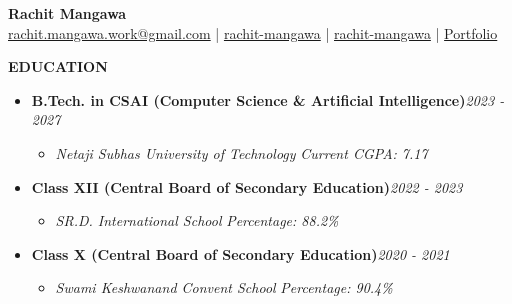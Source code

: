 \documentclass[10pt]{article}
\newcommand{\resheading}[1]{{\small \colorbox{mygrey}{\begin{minipage}{\dimexpr\textwidth-2\fboxsep\relax}\textbf{#1 \vphantom{p\^{E}}}\end{minipage}}}}
\begin{document}
\noindent
\begin{minipage}{1.0\linewidth}
    \centering
    {\huge\bfseries Rachit Mangawa}\\[3pt]
    {
  \href{mailto:rachit.mangawa.work@gmail.com}{rachit.mangawa.work@gmail.com} |
     \href{https://www.linkedin.com/in/rachit-mangawa/}{rachit-mangawa} |
     \href{https://github.com/rachit-mangawa}{rachit-mangawa} | 
    \href{https://rachit-mangawa.github.io/}{Portfolio}}
\end{minipage}

\vspace{4pt}

\noindent
\resheading{EDUCATION}
\begin{itemize}[leftmargin=*]\small
\item \textbf{B.Tech. in CSAI (Computer Science \& Artificial Intelligence)}\hfill \textit{2023 - 2027}
\begin{itemize}[noitemsep, leftmargin=*, label=-]\footnotesize
\item \textit{Netaji Subhas University of Technology} \hfill \textit{Current CGPA: 7.17}
\end{itemize}
\end{itemize}

\begin{itemize}[leftmargin=*]\small
\item \textbf{Class XII (Central Board of Secondary Education)}\hfill \textit{2022 - 2023}
\begin{itemize}[noitemsep, leftmargin=*, label=-]\footnotesize
\item \textit{SR.D. International School} \hfill \textit{Percentage: 88.2\%}
\end{itemize}
\end{itemize}

\begin{itemize}[leftmargin=*]\small
\item \textbf{Class X (Central Board of Secondary Education)}\hfill \textit{2020 - 2021}
\begin{itemize}[noitemsep, leftmargin=*, label=-]\footnotesize
\item \textit{Swami Keshwanand Convent School} \hfill \textit{Percentage: 90.4\%}
\end{itemize}
\end{itemize}
\end{document}

